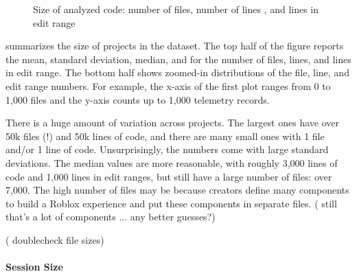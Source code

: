\documentclass[english,submission,cleveref]{programming}
\begin{document}
\begin{figure}[t]
\begin{tabular}{l@{}r@{~}l@{}r@{~}l@{}r@{~}l}
  \end{tabular}

  \caption{Size of analyzed code: number of files, number of lines , and lines in edit range}
  \label{f:codebase-size}
\end{figure}

 summarizes the size of projects in the dataset.
The top half of the figure reports the mean, standard deviation, median,
and  for the number of files, lines, and lines in edit range.
The bottom half shows zoomed-in distributions of the file, line, and edit range
numbers.
For example, the x-axis of the first plot ranges from 0 to 1,000 files and
the y-axis counts up to 1,000 telemetry records.

There is a huge amount of variation across projects.
The largest ones have over 50k files (!) and 50k lines of code, and %
there are many small ones with 1 file and/or 1 line of code.
Unsurprisingly, the numbers come with large standard deviations.
The median values are more reasonable, with roughly 3,000 lines of code
and 1,000 lines in edit ranges, but still have a large number of files: over 7,000.
The high number of files may be because creators define many components to
build a Roblox experience and put these components in separate files.
(\FILL{} still that's a lot of components ... any better guesses?)

(\FILL{} doublecheck file sizes)

\paragraph{Session Size}
\end{document}
